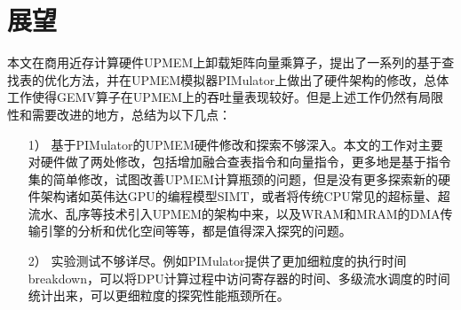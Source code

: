\section{展望}
本文在商用近存计算硬件UPMEM上卸载矩阵向量乘算子，提出了一系列的基于查找表的优化方法，并在UPMEM模拟器PIMulator上做出了硬件架构的修改，总体工作使得GEMV算子在UPMEM上的吞吐量表现较好。但是上述工作仍然有局限性和需要改进的地方，总结为以下几点：
\begin{itemize}
	\item [1）]
	基于PIMulator的UPMEM硬件修改和探索不够深入。本文的工作对主要对硬件做了两处修改，包括增加融合查表指令和向量指令，更多地是基于指令集的简单修改，试图改善UPMEM计算瓶颈的问题，但是没有更多探索新的硬件架构诸如英伟达GPU的编程模型SIMT，或者将传统CPU常见的超标量、超流水、乱序等技术引入UPMEM的架构中来，以及WRAM和MRAM的DMA传输引擎的分析和优化空间等等，都是值得深入探究的问题。
	\item [2）]
	实验测试不够详尽。例如PIMulator提供了更加细粒度的执行时间breakdown，可以将DPU计算过程中访问寄存器的时间、多级流水调度的时间统计出来，可以更细粒度的探究性能瓶颈所在。
\end{itemize}
